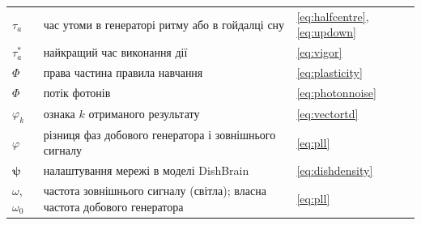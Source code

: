 \begin{center}
\begin{longtable}{>{\raggedright}p{2.0cm}>{\raggedright}p{9.6cm}>{\raggedright\arraybackslash}p{2.4cm}}
$\tau_a$ & час утоми в генераторі ритму або в гойдалці сну & \eqref{eq:halfcentre}, \eqref{eq:updown} \\
$\tau_a^*$ & найкращий час виконання дії & \eqref{eq:vigor} \\
$\Phi$ & права частина правила навчання & \eqref{eq:plasticity} \\
$\Phi$ & потік фотонів & \eqref{eq:photonnoise} \\
$\varphi_k$ & ознака $k$ отриманого результату & \eqref{eq:vectortd} \\
$\varphi$ & різниця фаз добового генератора і зовнішнього сигналу & \eqref{eq:pll} \\
$\boldsymbol\psi$ & налаштування мережі в моделі DishBrain & \eqref{eq:dishdensity} \\
$\omega$, $\omega_0$ & частота зовнішнього сигналу (світла); власна частота добового генератора & \eqref{eq:pll} \\
\end{longtable}
\end{center}
